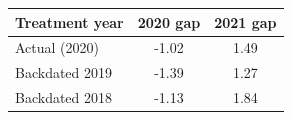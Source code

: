 \begin{tabular}{lcc}
\hline
Treatment year & 2020 gap & 2021 gap \\
\hline
Actual (2020) & -1.02 & 1.49 \\
Backdated 2019 & -1.39 & 1.27 \\
Backdated 2018 & -1.13 & 1.84 \\
\hline
\end{tabular}
